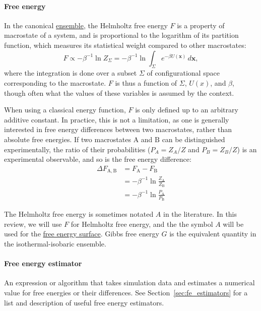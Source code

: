 \documentclass[9pt,review]{livecoms}
\newcommand{\vx}{\mathbf{x}}
\newcommand{\A}{\mathrm{A}}
\newcommand{\B}{\mathrm{B}}
\begin{document}
\paragraph{Free energy}
In the canonical \hyperlink{ref:Ensemble} {ensemble}, the Helmholtz free energy $F$ is a property of macrostate of a system, and is proportional to the logarithm of its partition function, which measures its statistical weight compared to other macrostates:
\begin{equation}
F \propto -\beta^{-1} \ln Z_{\Sigma} = -\beta^{-1} \ln \int_\Sigma e^{-\beta U(\vx)} \, d\vx,
\end{equation}
where the integration is done over a subset $\Sigma$ of configurational space corresponding to the macrostate. $F$ is thus a function of $\Sigma$, $U(x)$, and $\beta$, though often what the values of these variables is assumed by the context.

When using a classical energy function, $F$ is only defined up to an arbitrary additive constant.
In practice, this is not a limitation, as one is generally interested in free energy differences between two macrostates, rather than absolute free energies.
If two macrostates $\A$ and $\B$ can be distinguished experimentally, the ratio of their probabilities ($P_A = Z_A/Z$ and $P_B = Z_B/Z$) is an experimental observable, and so is the free energy difference:
\begin{align}
  \Delta F_{\A,\B} &= F_{\A} - F_{\B} \nonumber\\
    & = -\beta^{-1} \ln \frac{Z_{\A}}{Z_{\B}} \nonumber\\
  & = -\beta^{-1} \ln \frac{P_{\A}}{P_{\B}}
\end{align}

The Helmholtz free energy is sometimes notated $A$ in the literature. In this review, we will use $F$ for Helmholtz free energy, and the the symbol $A$ will be used for the \hyperlink{ref:FES} {free energy surface}. Gibbs free energy $G$ is the equivalent quantity in the isothermal-isobaric ensemble.

\hypertarget{ref:FEestimator} {\paragraph{Free energy estimator}}
An expression or algorithm that takes simulation data and estimates a numerical value for free energies or their differences. See Section~\ref{sec:fe_estimators} for a list and description of useful free energy estimators.
\end{document}
